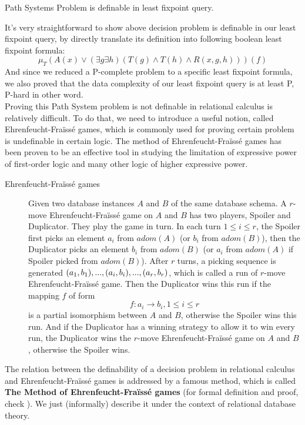 \begin{claim}
Path Systems Problem is definable in least fixpoint query.
\end{claim}

It's very straightforward to show above decision problem is definable in our least fixpoint query, by directly translate its definition into following boolean least fixpoint formula:
$$ \mu_T(A(x)\lor (\exists g \exists h)(T(g)\land T(h) \land R(x, g, h)))(f) $$
And since we reduced a P-complete problem to a specific least fixpoint formula, we also proved that the data complexity of our least fixpoint query is at least P, P-hard in other word.\\

Proving this Path System problem is not definable in relational calculus is relatively difficult. To do that, we need to introduce a useful notion, called Ehrenfeucht-Fra\"iss\'e games, which is commonly used for proving certain problem is undefinable in certain logic. The method of Ehrenfeucht-Fra\"iss\'e games has been proven to be an effective tool in studying the limitation of expressive power of first-order logic and many other logic of higher expressive power.

\begin{description}
\item[Ehrenfeucht-Fra\"iss\'e games]
Given two database instances $A$ and $B$ of the same database schema. A $r$-move Ehrenfeucht-Fra\"iss\'e game on $A$ and $B$ has two players, Spoiler and Duplicator. They play the game in turn. In each turn $1\leq i \leq r$, the Spoiler first picks an element $a_i$ from $adom(A)$ (or $b_i$ from $adom(B)$), then the Duplicator picks an element $b_i$ from $adom(B)$ (or $a_i$ from $adom(A)$ if Spoiler picked from $adom(B)$). After $r$ turns, a picking sequence is generated $(a_1, b_1),...,(a_i,b_i),...,\\(a_r, b_r)$, which is called a run of $r$-move Ehrenfeucht-Fra\"iss\'e game. Then the Duplicator wins this run if the mapping $f$ of form
$$ f: a_i\rightarrow b_i, 1\leq i \leq r$$
is a partial isomorphism between $A$ and $B$, otherwise the Spoiler wins this run. And if the Duplicator has a winning strategy to allow it to win every run, the Duplicator wins the $r$-move Ehrenfeucht-Fra\"iss\'e game on $A$ and $B$, otherwise the Spoiler wins.
\end{description}

The relation between the definability of a decision problem in relational calculus and Ehrenfeucht-Fra\"iss\'e games is addressed by a famous method, which is called \textbf{The Method of Ehrenfeucht-Fra\"iss\'e games} (for formal definition and proof, check \cite{kolaitis1}). We just (informally) describe it under the context of relational database theory.


